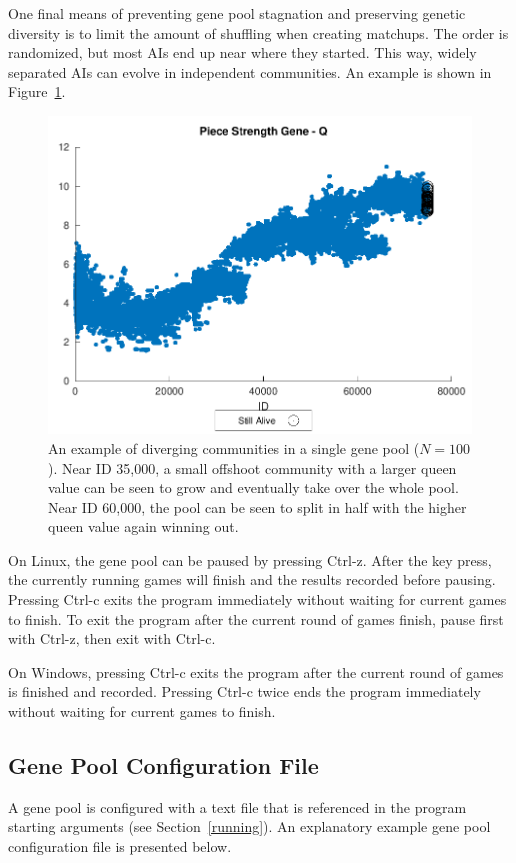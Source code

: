 \documentclass[letterpaper]{article}
\renewcommand{\_}{\allowbreak\textunderscore\allowbreak}
\begin{document}
One final means of preventing gene pool stagnation and preserving genetic diversity is to limit the amount of shuffling when creating matchups. The order is randomized, but most AIs end up near where they started. This way, widely separated AIs can evolve in independent communities. An example is shown in Figure~\ref{gene-pool-divergence}.

\begin{figure}[htb]
	\centering
	\includegraphics[width=\textwidth]{divergence-example}
	\caption{An example of diverging communities in a single gene pool (\(N=100\)). Near ID 35,000, a small offshoot community with a larger queen value can be seen to grow and eventually take over the whole pool. Near ID 60,000, the pool can be seen to split in half with the higher queen value again winning out.}\label{gene-pool-divergence}
\end{figure}

On Linux, the gene pool can be paused by pressing Ctrl-z. After the key press, the currently running games will finish and the results recorded before pausing. Pressing Ctrl-c exits the program immediately without waiting for current games to finish. To exit the program after the current round of games finish, pause first with Ctrl-z, then exit with Ctrl-c.

On Windows, pressing Ctrl-c exits the program after the current round of games is finished and recorded. Pressing Ctrl-c twice ends the program immediately without waiting for current games to finish.

\subsection{Gene Pool Configuration File}\label{gene-pool-config}
A gene pool is configured with a text file that is referenced in the program starting arguments (see Section~\ref{running}). An explanatory example gene pool configuration file is presented below.

\end{document}
